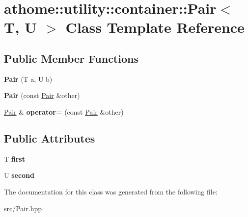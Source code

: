 \hypertarget{classathome_1_1utility_1_1container_1_1_pair}{}\section{athome\+:\+:utility\+:\+:container\+:\+:Pair$<$ T, U $>$ Class Template Reference}
\label{classathome_1_1utility_1_1container_1_1_pair}
\subsection*{Public Member Functions}
\begin{DoxyCompactItemize}
\item 
\mbox{\label{classathome_1_1utility_1_1container_1_1_pair_a1d3f7756be96ae5657dbd9969cbf5cb2}} 
{\bfseries Pair} (T a, U b)
\item 
\mbox{\label{classathome_1_1utility_1_1container_1_1_pair_a25ec916d580d4b2f9aaa3bae795309fb}} 
{\bfseries Pair} (const \mbox{\hyperlink{classathome_1_1utility_1_1container_1_1_pair}{Pair}} \&other)
\item 
\mbox{\label{classathome_1_1utility_1_1container_1_1_pair_a1c8d3b86cc610a7e57df4b91a350b6c0}} 
\mbox{\hyperlink{classathome_1_1utility_1_1container_1_1_pair}{Pair}} \& {\bfseries operator=} (const \mbox{\hyperlink{classathome_1_1utility_1_1container_1_1_pair}{Pair}} \&other)
\end{DoxyCompactItemize}
\subsection*{Public Attributes}
\begin{DoxyCompactItemize}
\item 
\mbox{\label{classathome_1_1utility_1_1container_1_1_pair_a423180e68d5637eae013a76ebe4b01b9}} 
T {\bfseries first}
\item 
\mbox{\label{classathome_1_1utility_1_1container_1_1_pair_a321fbe17e4fae2f03a06908cef5ad05d}} 
U {\bfseries second}
\end{DoxyCompactItemize}


The documentation for this class was generated from the following file\+:\begin{DoxyCompactItemize}
\item 
src/Pair.\+hpp\end{DoxyCompactItemize}
